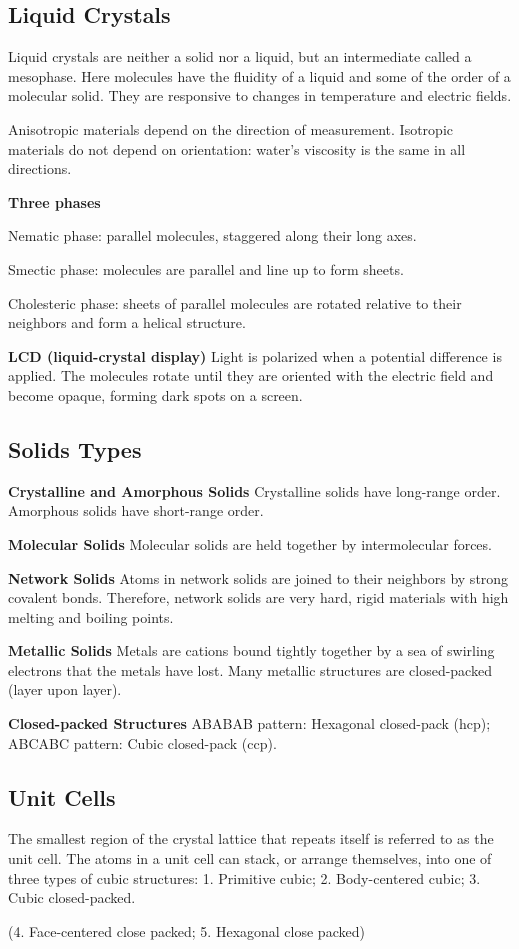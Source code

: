 \documentclass[a4paper,12pt]{article}
\begin{document}
\subsection{Liquid Crystals}
Liquid crystals are neither a solid nor a liquid, but an intermediate called a mesophase. Here molecules have the fluidity of a liquid and some of the order of a molecular solid. They are responsive to changes in temperature and electric fields.\par
Anisotropic materials depend on the direction of measurement. Isotropic materials do not depend on orientation: water’s viscosity is the same in all directions.\par
\textbf{Three phases}\par
Nematic phase: parallel molecules, staggered along their long axes.\par
Smectic phase: molecules are parallel and line up to form sheets.\par
Cholesteric phase: sheets of parallel molecules are rotated relative to their neighbors and form a helical structure.\par
\textbf{LCD (liquid-crystal display)} Light is polarized when a potential difference is applied. The molecules rotate until they are oriented with the electric field and become opaque, forming dark spots on a screen.
\subsection{Solids Types}
\textbf{Crystalline and Amorphous Solids} Crystalline solids have long-range order. Amorphous solids have short-range order.\par
\textbf{Molecular Solids} Molecular solids are held together by intermolecular forces.\par
\textbf{Network Solids} Atoms in network solids are joined to their neighbors by strong covalent bonds. Therefore, network solids are very hard, rigid materials with high melting and boiling points.\par
\textbf{Metallic Solids} Metals are cations bound tightly together by a sea of swirling electrons that the metals have lost. Many metallic structures are closed-packed (layer upon layer).\par
\textbf{Closed-packed Structures} ABABAB pattern: Hexagonal closed-pack (hcp); ABCABC pattern: Cubic closed-pack (ccp).
\subsection{Unit Cells}
The smallest region of the crystal lattice that repeats itself is referred to as the unit cell. The atoms in a unit cell can stack,
or arrange themselves, into one of three types of cubic structures: 1. Primitive cubic; 2. Body-centered cubic; 3. Cubic closed-packed.\par
\noindent(4. Face-centered close packed; 5. Hexagonal close packed)
\end{document}
